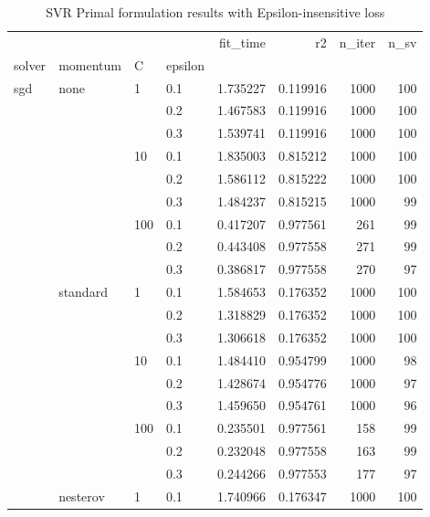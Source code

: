 \begin{table}[H]
\centering
\caption{SVR Primal formulation results with Epsilon-insensitive loss}
\label{primal_svr_eps_cv_results}
\begin{tabular}{llllrrrr}
\toprule
          &   &     &     &  fit\_time &        r2 &  n\_iter &  n\_sv \\
solver & momentum & C & epsilon &           &           &         &       \\
\midrule
sgd & none & 1   & 0.1 &  1.735227 &  0.119916 &    1000 &   100 \\
          &   &     & 0.2 &  1.467583 &  0.119916 &    1000 &   100 \\
          &   &     & 0.3 &  1.539741 &  0.119916 &    1000 &   100 \\
          &   & 10  & 0.1 &  1.835003 &  0.815212 &    1000 &   100 \\
          &   &     & 0.2 &  1.586112 &  0.815222 &    1000 &   100 \\
          &   &     & 0.3 &  1.484237 &  0.815215 &    1000 &    99 \\
          &   & 100 & 0.1 &  0.417207 &  0.977561 &     261 &    99 \\
          &   &     & 0.2 &  0.443408 &  0.977558 &     271 &    99 \\
          &   &     & 0.3 &  0.386817 &  0.977558 &     270 &    97 \\
          & standard & 1   & 0.1 &  1.584653 &  0.176352 &    1000 &   100 \\
          &   &     & 0.2 &  1.318829 &  0.176352 &    1000 &   100 \\
          &   &     & 0.3 &  1.306618 &  0.176352 &    1000 &   100 \\
          &   & 10  & 0.1 &  1.484410 &  0.954799 &    1000 &    98 \\
          &   &     & 0.2 &  1.428674 &  0.954776 &    1000 &    97 \\
          &   &     & 0.3 &  1.459650 &  0.954761 &    1000 &    96 \\
          &   & 100 & 0.1 &  0.235501 &  0.977561 &     158 &    99 \\
          &   &     & 0.2 &  0.232048 &  0.977558 &     163 &    99 \\
          &   &     & 0.3 &  0.244266 &  0.977553 &     177 &    97 \\
          & nesterov & 1   & 0.1 &  1.740966 &  0.176347 &    1000 &   100 \\

\end{tabular}
\end{table}
